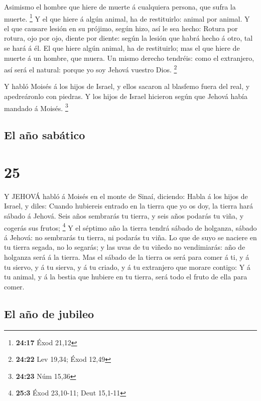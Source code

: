  Asimismo el hombre que hiere de muerte á cualquiera
persona, que sufra la muerte. \footnote{\textbf{24:17} Éxod 21,12}
 Y el que hiere á algún animal, ha de restituirlo: animal
por animal.  Y el que causare lesión en su prójimo, según
hizo, así le sea hecho:  Rotura por rotura, ojo por ojo,
diente por diente: según la lesión que habrá hecho á otro, tal se hará á
él.  El que hiere algún animal, ha de restituirlo; mas el
que hiere de muerte á un hombre, que muera.  Un mismo
derecho tendréis: como el extranjero, así será el natural: porque yo soy
Jehová vuestro Dios. \footnote{\textbf{24:22} Lev 19,34; Éxod 12,49}

 Y habló Moisés á los hijos de Israel, y ellos sacaron al
blasfemo fuera del real, y apedreáronlo con piedras. Y los hijos de
Israel hicieron según que Jehová había mandado á Moisés. \footnote{\textbf{24:23}
  Núm 15,36}

\hypertarget{el-auxf1o-sabuxe1tico}{%
\subsection{El año sabático}\label{el-auxf1o-sabuxe1tico}}

\hypertarget{section-24}{%
\section{25}\label{section-24}}

 Y JEHOVÁ habló á Moisés en el monte de Sinaí, diciendo:
 Habla á los hijos de Israel, y diles: Cuando hubiereis
entrado en la tierra que yo os doy, la tierra hará sábado á Jehová.
 Seis años sembrarás tu tierra, y seis años podarás tu viña,
y cogerás sus frutos; \footnote{\textbf{25:3} Éxod 23,10-11; Deut
  15,1-11}  Y el séptimo año la tierra tendrá sábado de
holganza, sábado á Jehová: no sembrarás tu tierra, ni podarás tu viña.
 Lo que de suyo se naciere en tu tierra segada, no lo
segarás; y las uvas de tu viñedo no vendimiarás: año de holganza será á
la tierra.  Mas el sábado de la tierra os será para comer á
ti, y á tu siervo, y á tu sierva, y á tu criado, y á tu extranjero que
morare contigo:  Y á tu animal, y á la bestia que hubiere en
tu tierra, será todo el fruto de ella para comer.

\hypertarget{el-auxf1o-de-jubileo}{%
\subsection{El año de jubileo}\label{el-auxf1o-de-jubileo}}

